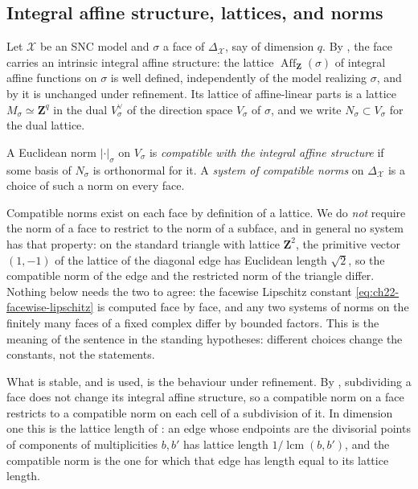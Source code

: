 \subsection{Integral affine structure, lattices, and norms}

Let \(\mathcal X\) be an SNC model and \(\sigma\) a face of
\(\Delta_{\mathcal X}\), say of dimension \(q\).  By
, the face carries
an intrinsic integral affine structure: the lattice
\(\operatorname{Aff}_{\mathbf Z}(\sigma)\) of integral affine functions on
\(\sigma\) is well defined, independently of the model realizing
\(\sigma\), and by  it is unchanged
under refinement.  Its lattice of affine-linear parts is a lattice
\(M_\sigma\simeq\mathbf Z^q\) in the dual \(V_\sigma^\vee\) of the direction
space \(V_\sigma\) of \(\sigma\), and we write
\(N_\sigma\subset V_\sigma\) for the dual lattice.

\begin{definition}
\label{def:ch22-compatible-norm}
A Euclidean norm \(|\cdot|_\sigma\) on \(V_\sigma\) is \emph{compatible with
the integral affine structure} if some basis of \(N_\sigma\) is orthonormal
for it.  A \emph{system of compatible norms} on \(\Delta_{\mathcal X}\) is a
choice of such a norm on every face.
\end{definition}

Compatible norms exist on each face by definition of a lattice.  We do
\emph{not} require the norm of a face to restrict to the norm of a subface,
and in general no system has that property: on the standard triangle with
lattice \(\mathbf Z^2\), the primitive vector \((1,-1)\) of the lattice of
the diagonal edge has Euclidean length \(\sqrt2\), so the compatible norm of
the edge and the restricted norm of the triangle differ.  Nothing below
needs the two to agree: the facewise Lipschitz constant
\eqref{eq:ch22-facewise-lipschitz} is computed face by face, and any two
systems of norms on the finitely many faces of a fixed complex differ by
bounded factors.  This is the meaning of the sentence in the standing
hypotheses: different choices change the constants, not the statements.

What is stable, and is used, is the behaviour under refinement.  By
, subdividing a face does not change
its integral affine structure, so a compatible norm on a face restricts to a
compatible norm on each cell of a subdivision of it.  In dimension one this
is the lattice length of : an edge whose endpoints
are the divisorial points of components of multiplicities \(b,b'\) has
lattice length \(1/\operatorname{lcm}(b,b')\), and the compatible norm is
the one for which that edge has length equal to its lattice length.

